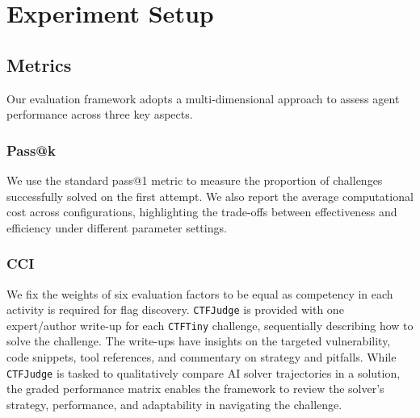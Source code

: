 \section{Experiment Setup}


\subsection{Metrics}
Our evaluation framework adopts a multi-dimensional approach to assess agent performance across three key aspects.

\subsubsection{Pass@k} We use the standard pass@1 metric to measure the proportion of challenges successfully solved on the first attempt. We also report the average computational cost across configurations, highlighting the trade-offs between effectiveness and efficiency under different parameter settings.
\subsubsection{CCI} We fix the weights of six evaluation factors to be equal as competency in each activity is required for flag discovery. \texttt{CTFJudge} is provided with one expert/author write-up for each \texttt{CTFTiny} challenge, sequentially describing how to solve the challenge. The write-ups have insights on the targeted vulnerability, code snippets, tool references, and commentary on strategy and pitfalls. While \texttt{CTFJudge} is tasked to qualitatively compare AI solver trajectories in a solution, the graded performance matrix enables the framework to review the solver's strategy,  performance, and adaptability in navigating the challenge. %


